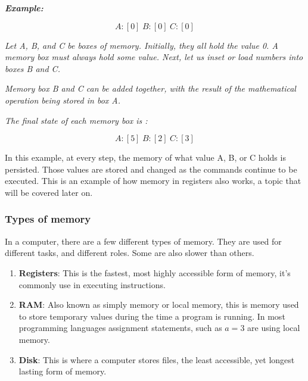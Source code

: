 \emph{\textbf{Example:}}
\begin{center}
$$
A:[0] \hspace{3pt} B:[0] \hspace{3pt} C:[0]
$$

\emph{Let A, B, and C be boxes of memory. Initially, they all hold the value 0. A memory box must always hold some value. Next, let us inset or load numbers into boxes B and C.}


\emph{Memory box B and C can be added together, with the result of the mathematical operation being stored in box A. }


\emph{The final state of each memory box is :}

$$
A:[5] \hspace{3pt} B:[2] \hspace{3pt} C:[3]
$$
\end{center}

In this example, at every step, the memory of what value A, B, or C holds is persisted. Those values are stored and changed as the commands continue to be executed. This is an example of how memory in registers also works, a topic that will be covered later on.

\subsubsection{Types of memory}

In a computer, there are a few different types of memory. They are used for different tasks, and different roles. Some are also slower than others.

\begin{enumerate}
\item \textbf{Registers}: This is the fastest, most highly accessible form of memory, it's commonly use in executing instructions.
\item \textbf{RAM}: Also known as simply memory or local memory, this is memory used to store temporary values during the time a program is running. In most programming languages assignment statements, such as $a = 3$ are using local memory.
\item \textbf{Disk}: This is where a computer stores files, the least accessible, yet longest lasting form of memory. 
\end{enumerate}

